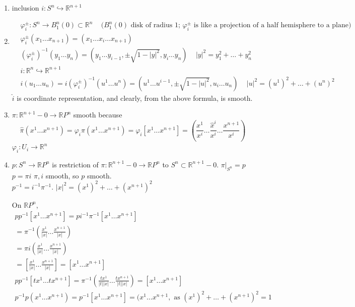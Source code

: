 \begin{enumerate}
\item[(a)] inclusion $i: S^n \hookrightarrow \mathbb{R}^{n+1}$ 
\item[(b)]
\[
\begin{aligned}
  & \varphi_i^{\pm}:S^n \to B_1^n(0) \subset \mathbb{R}^n \quad \, \text{($B_1^n(0)$ disk of radius 1; $\varphi_i^{\pm} $ is like a projection of a half hemisphere to a plane)} \\
  & \varphi_i^{\pm}(x_1 \dots x_{n+1}) = (x_1 \dots \widehat{x}_i \dots x_{n+1} ) \\ 
  & (\varphi_i^{\pm})^{-1}(y_1 \dots y_n) = (y_1 \dots y_{i-1}, \pm \sqrt{ 1 - |y|^2 } , y_i \dots y_n ) \quad \, |y|^2 = y_1^2 + \dots + y_n^2 
\end{aligned}
\]
\[
\begin{aligned}
  & \widehat{i} : \mathbb{R}^n \hookrightarrow \mathbb{R}^{n+1} \\ 
  & \widehat{i}(u_1 \dots u_n) = i (\varphi_i^{\pm})^{-1}(u^1 \dots u^n) = (u^1 \dots u^{i-1}, \pm \sqrt{ 1 - |u|^2 } , u_i \dots u_n )  \quad \, |u|^2 =  (u^1)^2  + \dots + (u^n)^2 
\end{aligned}
\]
$\widehat{i}$ is coordinate representation, and clearly, from the above formula, is smooth.  
\item[(c)] $\pi : \mathbb{R}^{n+1} - 0 \to \mathbb{R}P^n$ smooth because
\[
\widehat{\pi}(x^1 \dots x^{n+1})  = \varphi_i \pi(x^1 \dots x^{n+1}) = \varphi_i[x^1 \dots x^{n+1}] = \left( \frac{x^1 }{ x^i } \dots \frac{ \widehat{x}^i}{ x^i } \dots \frac{x^{n+1}}{ x^i } \right)
\]
$\varphi_i : U_i \to \mathbb{R}^n$
\item[(d)] $p : S^n \to \mathbb{R}P^n$ is restriction of $\pi: \mathbb{R}^{n+1} - 0 \to \mathbb{R}P^n$ to $S^n \subset \mathbb{R}^{n+1} -0$.  $\left. \pi \right|_{S^n} = p$ \\
$p = \pi i$ $\pi,i$ smooth, so $p$ smooth.  \\
$p^{-1} = i^{-1} \pi^{-1}$.  $|x|^2 = (x^1)^2 + \dots + (x^{n+1})^2$

On $\mathbb{R}P^n$,
\[
\begin{gathered}
  pp^{-1}[x^1 \dots x^{n+1} ] = p i^{-1} \pi^{-1}[x^1 \dots x^{n+1} ] \\
  = \pi^{-1}\left( \frac{x^1}{ |x| } \dots \frac{x^{n+1}}{ |x| } \right) \\
  = \pi i\left( \frac{x^1}{|x|} \dots \frac{x^{n+1}}{ |x|} \right) \\
  = \left[ \frac{x^1}{ |x|} \dots \frac{x^{n+1}}{ |x|} \right] = [x^1 \dots x^{n+1} ] \\
  pp^{-1}[tx^1 \dots tx^{n+1} ] = \pi^{-1}\left( \frac{tx^1}{ |t||x|} \dots \frac{t x^{n+1}}{ |t||x| } \right) = [x^1 \dots x^{n+1} ] \\ 
   p^{-1}p(x^1 \dots x^{n+1} ) = p^{-1}[x^1 \dots x^{n+1}] = (x^1 \dots x^{n+1}, \text{ as } (x^1)^2 + \dots + (x^{n+1})^2 = 1
\end{gathered}
\]


\end{enumerate}
